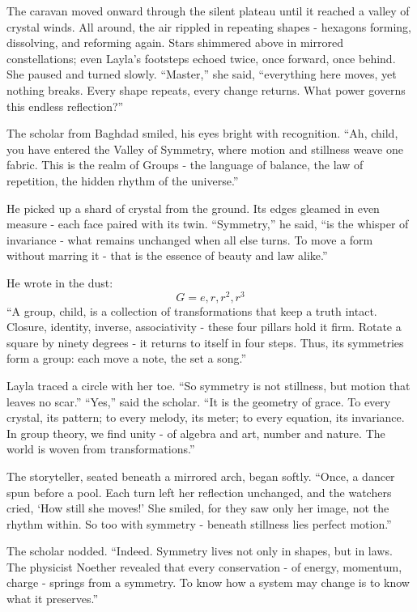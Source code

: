 \documentclass[
  letterpaper,
  DIV=11,
  numbers=noendperiod]{scrreprt}
\begin{document}
The caravan moved onward through the silent plateau until it reached a
valley of crystal winds. All around, the air rippled in repeating shapes
- hexagons forming, dissolving, and reforming again. Stars shimmered
above in mirrored constellations; even Layla's footsteps echoed twice,
once forward, once behind. She paused and turned slowly. ``Master,'' she
said, ``everything here moves, yet nothing breaks. Every shape repeats,
every change returns. What power governs this endless reflection?''

The scholar from Baghdad smiled, his eyes bright with recognition. ``Ah,
child, you have entered the Valley of Symmetry, where motion and
stillness weave one fabric. This is the realm of Groups - the language
of balance, the law of repetition, the hidden rhythm of the universe.''

He picked up a shard of crystal from the ground. Its edges gleamed in
even measure - each face paired with its twin. ``Symmetry,'' he said,
``is the whisper of invariance - what remains unchanged when all else
turns. To move a form without marring it - that is the essence of beauty
and law alike.''

He wrote in the dust: \[
G = { e, r, r^2, r^3 }
\] ``A group, child, is a collection of transformations that keep a
truth intact. Closure, identity, inverse, associativity - these four
pillars hold it firm. Rotate a square by ninety degrees - it returns to
itself in four steps. Thus, its symmetries form a group: each move a
note, the set a song.''

Layla traced a circle with her toe. ``So symmetry is not stillness, but
motion that leaves no scar.'' ``Yes,'' said the scholar. ``It is the
geometry of grace. To every crystal, its pattern; to every melody, its
meter; to every equation, its invariance. In group theory, we find unity
- of algebra and art, number and nature. The world is woven from
transformations.''

The storyteller, seated beneath a mirrored arch, began softly. ``Once, a
dancer spun before a pool. Each turn left her reflection unchanged, and
the watchers cried, `How still she moves!' She smiled, for they saw only
her image, not the rhythm within. So too with symmetry - beneath
stillness lies perfect motion.''

The scholar nodded. ``Indeed. Symmetry lives not only in shapes, but in
laws. The physicist Noether revealed that every conservation - of
energy, momentum, charge - springs from a symmetry. To know how a system
may change is to know what it preserves.''
\end{document}
